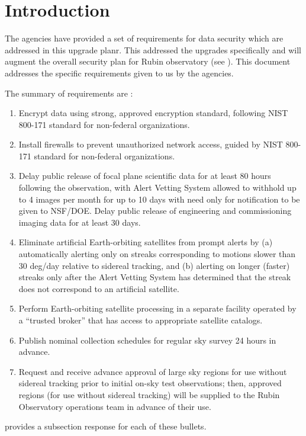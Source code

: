 \section{Introduction}

The agencies have provided a set of requirements for data security which are addressed in this upgrade planr.  This addressed the upgrades specifically and will augment the overall security plan for Rubin observatory (see ).
This document addresses the specific requirements given to us by the agencies.

The summary of requirements are :
\begin{enumerate}

\item	Encrypt data using strong, approved encryption standard, following NIST 800-171 standard for  non-federal organizations.
\item	Install firewalls to prevent unauthorized network access, guided by NIST 800-171 standard for  non-federal organizations.
\item	Delay public release of focal plane scientific data for at least 80 hours following the observation, with Alert Vetting System allowed to withhold up to 4 images per month for up to 10 days with need only for notification to be given to NSF/DOE. Delay public release of engineering and commissioning imaging data for at least 30 days.
\item	Eliminate artificial Earth-orbiting satellites from prompt alerts by (a) automatically alerting only on streaks corresponding to motions slower than 30 deg/day relative to sidereal tracking, and (b) alerting on longer (faster) streaks only after the Alert Vetting System has determined that the streak does not correspond to an artificial satellite.
\item	Perform Earth-orbiting satellite processing in a separate facility operated by a “trusted broker” that has access to appropriate satellite catalogs.
\item	Publish nominal collection schedules for regular sky survey 24 hours in advance.
\item	Request and receive advance approval of large sky regions for use without sidereal tracking prior to initial on-sky test observations; then, approved regions (for use without sidereal tracking) will be supplied to the Rubin Observatory operations team in advance of their use.

\end{enumerate}


 provides a subsection response for each of these bullets.
